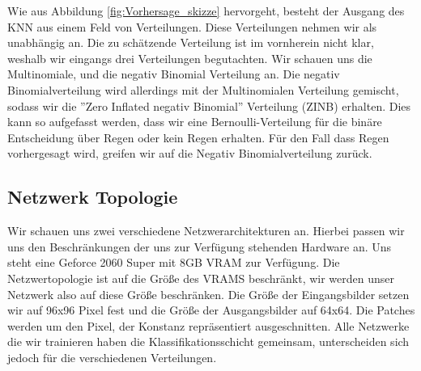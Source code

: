 \noindent Wie aus Abbildung \ref{fig:Vorhersage_skizze} hervorgeht, besteht der Ausgang des KNN aus einem Feld von Verteilungen. Diese Verteilungen nehmen wir als unabhängig an.
Die zu schätzende Verteilung ist im vornherein nicht klar, weshalb wir eingangs drei Verteilungen begutachten.
Wir schauen uns die Multinomiale, und die negativ Binomial Verteilung an.
Die negativ Binomialverteilung wird allerdings mit der Multinomialen Verteilung gemischt, sodass wir die ''Zero Inflated negativ Binomial'' Verteilung (ZINB) erhalten.
Dies kann so aufgefasst werden, dass wir eine Bernoulli-Verteilung für die binäre Entscheidung über Regen oder kein Regen erhalten. Für den Fall dass Regen vorhergesagt wird, greifen wir auf die Negativ Binomialverteilung zurück.
\\

\subsection{Netzwerk Topologie}

\noindent Wir schauen uns zwei verschiedene Netzwerarchitekturen an. Hierbei passen wir uns den Beschränkungen der uns zur Verfügung stehenden Hardware an.
Uns steht eine Geforce 2060 Super mit 8GB VRAM zur Verfügung. Die Netzwertopologie ist auf die Größe des VRAMS beschränkt, wir werden unser Netzwerk also auf diese Größe beschränken. Die Größe der Eingangsbilder setzen wir auf 96x96 Pixel fest und die Größe der Ausgangsbilder auf 64x64. Die Patches werden um den Pixel, der Konstanz repräsentiert ausgeschnitten.
Alle Netzwerke die wir trainieren haben die Klassifikationsschicht gemeinsam, unterscheiden sich jedoch für die verschiedenen Verteilungen.\\

